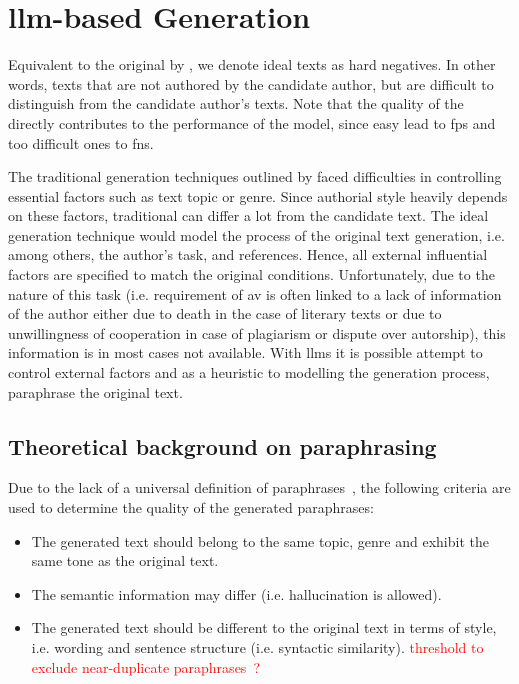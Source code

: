 \section{\acs{llm}-based \Imp{} Generation}
\label{sec:impostor_generation}

Equivalent to the original \impAppr{} by \citet{koppel_determining_2014}, we denote ideal \imp{} texts as hard negatives.
In other words, texts that are not authored by the candidate author, but are difficult to distinguish from the candidate author's texts.
Note that the quality of the \imps{} directly contributes to the performance of the model, 
since easy \imps{} lead to \acp{fp} and too difficult ones to \acp{fn}.

The traditional generation techniques outlined by \citet{koppel_determining_2014} faced difficulties in controlling essential factors such as text topic or genre.
Since authorial style heavily depends on these factors, traditional \imps{} can differ a lot from the candidate text.
The ideal generation technique would model the process of the original text generation, 
i.e. among others, the author's task, and references.
Hence, all external influential factors are specified to match the original conditions.
Unfortunately, due to the nature of this task 
(i.e. requirement of \ac{av} is often linked to a lack of information of the author either due to death in the case of literary texts or 
due to unwillingness of cooperation in case of plagiarism or dispute over autorship), this information is in most cases not available.
With \acp{llm} it is possible attempt to control external factors and 
as a heuristic to modelling the generation process, paraphrase the original text.

\subsection{Theoretical background on paraphrasing} 

Due to the lack of a universal definition of paraphrases~\citep{gohsen_task_oriented_2024}, the following criteria are used to determine the quality of the generated paraphrases:
\begin{itemize}
    \item The generated text should belong to the same topic, genre and exhibit the same tone as the original text.
    \item The semantic information may differ (i.e. hallucination is allowed).
    \item The generated text should be different to the original text in terms of style, i.e. wording and sentence structure (i.e. syntactic similarity). \textcolor{red}{threshold to exclude near-duplicate paraphrases~\citep{gohsen_captions_2023}?}
\end{itemize}

